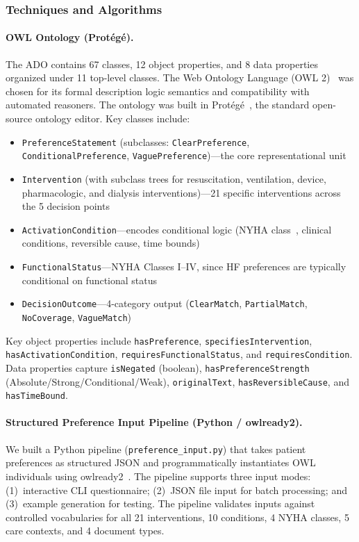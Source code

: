 \documentclass[11pt]{article}
\newcommand{\onto}[1]{\texttt{#1}}
\begin{document}
\subsubsection{Techniques and Algorithms}

\paragraph{OWL Ontology (Prot\'eg\'e).}
The ADO contains 67 classes, 12 object properties, and 8 data properties organized under 11 top-level classes. The Web Ontology Language (OWL 2)~\cite{owl2primer} was chosen for its formal description logic semantics and compatibility with automated reasoners. The ontology was built in Prot\'eg\'e~\cite{protege}, the standard open-source ontology editor. Key classes include:

\begin{itemize}[nosep]
    \item \onto{PreferenceStatement} (subclasses: \onto{ClearPreference}, \onto{ConditionalPreference}, \onto{VaguePreference})---the core representational unit
    \item \onto{Intervention} (with subclass trees for resuscitation, ventilation, device, pharmacologic, and dialysis interventions)---21 specific interventions across the 5 decision points
    \item \onto{ActivationCondition}---encodes conditional logic (NYHA class~\cite{nyha}, clinical conditions, reversible cause, time bounds)
    \item \onto{FunctionalStatus}---NYHA Classes I--IV, since HF preferences are typically conditional on functional status
    \item \onto{DecisionOutcome}---4-category output (\onto{ClearMatch}, \onto{PartialMatch}, \onto{NoCoverage}, \onto{VagueMatch})
\end{itemize}

Key object properties include \onto{hasPreference}, \onto{specifiesIntervention}, \onto{hasActivationCondition}, \onto{requiresFunctionalStatus}, and \onto{requiresCondition}. Data properties capture \onto{isNegated} (boolean), \onto{hasPreferenceStrength} (Absolute/Strong/Conditional/Weak), \onto{originalText}, \onto{hasReversibleCause}, and \onto{hasTimeBound}.

\paragraph{Structured Preference Input Pipeline (Python / owlready2).}
We built a Python pipeline (\texttt{preference\_input.py}) that takes patient preferences as structured JSON and programmatically instantiates OWL individuals using owlready2~\cite{owlready2}. The pipeline supports three input modes: (1)~interactive CLI questionnaire; (2)~JSON file input for batch processing; and (3)~example generation for testing. The pipeline validates inputs against controlled vocabularies for all 21 interventions, 10 conditions, 4 NYHA classes, 5 care contexts, and 4 document types.
\end{document}

